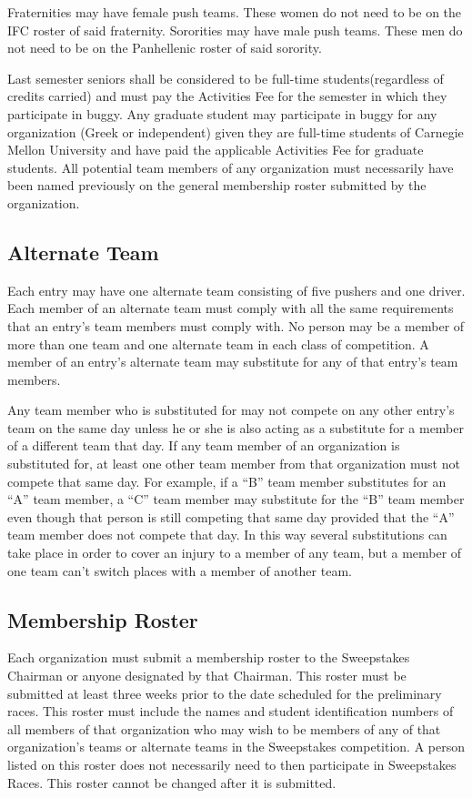 Fraternities may have female push teams. These women do not need to be on the IFC roster of said fraternity. Sororities may have male push teams. These men do not need to be on the Panhellenic roster of said sorority.

Last semester seniors shall be considered to be full-time students(regardless of credits carried) and must pay the Activities Fee for the semester in which they participate in buggy. Any graduate student may participate in buggy for any organization (Greek or independent) given they are full-time students of Carnegie Mellon University and have paid the applicable Activities Fee for graduate students. All potential team members of any organization must necessarily have been named previously on the general membership roster submitted by the organization.

\subsection{Alternate Team}
Each entry may have one alternate team consisting of five pushers and one driver. Each member of an alternate team must comply with all the same requirements that an entry's team members must comply with. No person may be a member of more than one team and one alternate team in each class of competition. A member of an entry's alternate team may substitute for any of that entry's team members.

Any team member who is substituted for may not compete on any other entry's team on the same day unless he or she is also acting as a substitute for a member of a different team that day. If any team member of an organization is substituted for, at least one other team member from that organization must not compete that same day. For example, if a ``B'' team member substitutes for an ``A'' team member, a ``C'' team member may substitute for the ``B'' team member even though that person is still competing that same day provided that the ``A'' team member does not compete that day. In this way several substitutions can take place in order to cover an injury to a member of any team, but a member of one team can't switch places with a member of another team.

\subsection{Membership Roster}
Each organization must submit a membership roster to the Sweepstakes Chairman or anyone designated by that Chairman. This roster must be submitted at least three weeks prior to the date scheduled for the preliminary races. This roster must include the names and student identification numbers of all members of that organization who may wish to be members of any of that organization's teams or alternate teams in the Sweepstakes competition. A person listed on this roster does not necessarily need to then participate in Sweepstakes Races. This roster cannot be changed after it is submitted.

